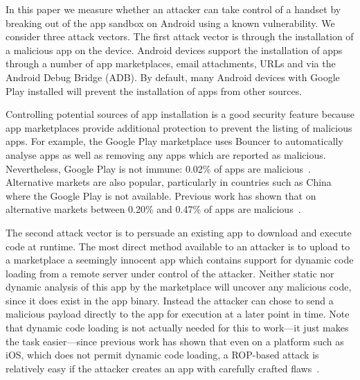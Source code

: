 \documentclass[conference,a4paper,twoside]{IEEEtran}
\begin{document}
In this paper we measure whether an attacker can take control of a handset by breaking out of the app sandbox on Android using a known vulnerability.
We consider three attack vectors.
The first attack vector is through the installation of a malicious app on the device.
Android devices support the installation of apps through a number of app marketplaces, email attachments, URLs and via the Android Debug Bridge (ADB).
By default, many Android devices with Google Play installed will prevent the installation of apps from other sources.

Controlling potential sources of app installation is a good security feature because app marketplaces provide additional protection to prevent the listing of malicious apps.
For example, the Google Play marketplace uses Bouncer to automatically analyse apps as well as removing any apps which are reported as malicious.
Nevertheless, Google Play is not immune: 0.02\% of apps are malicious~\cite{Zhou2012a}.
Alternative markets are also popular, particularly in countries such as China where the Google Play is not available. 
Previous work has shown that on alternative markets between 0.20\% and 0.47\% of apps are malicious~\cite{Zhou2012a}.

The second attack vector is to persuade an existing app to download and execute code at runtime.
The most direct method available to an attacker is to upload to a marketplace a seemingly innocent app which contains support for dynamic code loading from a remote server under control of the attacker.
Neither static nor dynamic analysis of this app by the marketplace will uncover any malicious code, since it does exist in the app binary.
Instead the attacker can chose to send a malicious payload directly to the app for execution at a later point in time. Note that dynamic code loading is not actually needed for this to work---it just makes the task easier---since previous work has shown that even on a platform such as iOS, which does not permit dynamic code loading, a ROP-based attack is relatively easy if the attacker creates an app with carefully crafted flaws~\cite{}.
\end{document}
